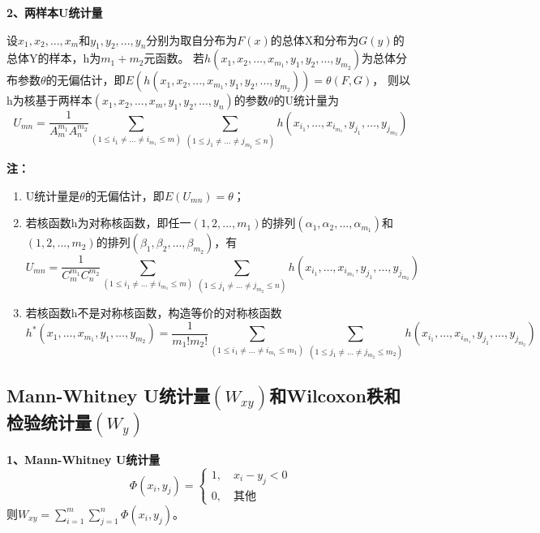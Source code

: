 \documentclass[lang=cn,10pt]{elegantbook}
\begin{document}
\textbf{2、两样本U统计量}
\begin{definition}
    设$x_1,x_2,...,x_m$和$y_1,y_2,...,y_n$分别为取自分布为$F(x)$的总体X和分布为$G(y)$的总体Y的样本，h为$m_1+m_2$元函数。
    若$h(x_1,x_2,...,x_{m_1},y_1,y_2,...,y_{m_2})$为总体分布参数$\theta$的无偏估计，即$E(h(x_1,x_2,...,x_{m_1},y_1,y_2,...,y_{m_2}))=\theta(F,G)$，
    则以h为核基于两样本$(x_1,x_2,...,x_m,y_1,y_2,...,y_n)$的参数$\theta$的U统计量为
    \begin{equation}
        U_{mn} = \frac1{A_m^{m_1}A_n^{{m}_2}}\sum_{(1\leq i_1\neq\ldots\neq i_{m_1}\leq m)}\sum_{(1\leq j_1\neq\ldots\neq j_{m_2}\leq n)}h(x_{i_1},\ldots,x_{i_{m_1}},y_{j_1},\ldots,y_{j_{m_2}})
    \end{equation}
\end{definition}
\textbf{注：}
\begin{enumerate}
    \item U统计量是$\theta$的无偏估计，即$E(U_{mn}) = \theta$；
    \item 若核函数h为对称核函数，即任一$(1,2,...,m_1)$的排列$(\alpha_{1},\alpha_{2},...,\alpha_{m_1})$和$(1,2,...,m_2)$的排列$(\beta_{1},\beta_{2},...,\beta_{m_2})$，有
          \begin{equation}
              U_{mn} = \frac1{C_m^{m_1}C_n^{{m}_2}}\sum_{(1\leq i_1\neq\ldots\neq i_{m_1}\leq m)}\sum_{(1\leq j_1\neq\ldots\neq j_{m_2}\leq n)}h(x_{i_1},\ldots,x_{i_{m_1}},y_{j_1},\ldots,y_{j_{m_2}})
          \end{equation}
    \item 若核函数h不是对称核函数，构造等价的对称核函数
          \begin{equation}
              h^*(x_1,\ldots,x_{m_1},y_1,\ldots,y_{m_2})=\frac1{m_1!m_2!}\sum_{(1\leq i_1\neq\ldots\neq i_{m_1}\leq m_1)}\sum_{(1\leq j_1\neq\ldots\neq j_{m_2}\leq m_2)}h(x_{i_1},\ldots,x_{i_{m_1}},y_{j_1},\ldots,y_{j_{m_2}})
          \end{equation}
\end{enumerate}

\subsection{Mann-Whitney U统计量$(W_{xy})$和Wilcoxon秩和检验统计量$(W_y)$}

\textbf{1、Mann-Whitney U统计量}
\begin{equation}
    \Phi(x_{i},y_{j})=\begin{cases}{1,\quad x_{i}-y_{j}<0}\\{0,\quad\text{其他}}\end{cases}
\end{equation}
则$W_{xy} = \sum_{i = 1}^m\sum_{j = 1}^n \Phi(x_i,y_j)$。
\end{document}
